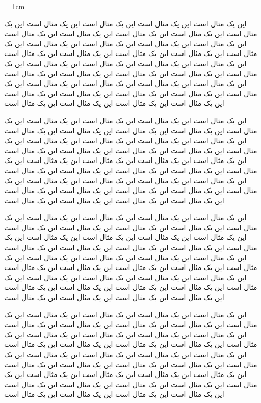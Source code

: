 \documentclass{report}
\begin{document}
\baselineskip = 1cm

این یک مثال است این یک مثال است این یک مثال است این یک مثال است این یک مثال است این یک مثال است این یک مثال است این یک مثال است این یک مثال است این یک مثال است
این یک مثال است این یک مثال است این یک مثال است این یک مثال است این یک مثال است این یک مثال است این یک مثال است این یک مثال است این یک مثال است این یک مثال است
این یک مثال است این یک مثال است این یک مثال است این یک مثال است این یک مثال است این یک مثال است این یک مثال است این یک مثال است این یک مثال است این یک مثال است
این یک مثال است این یک مثال است این یک مثال است این یک مثال است این یک مثال است این یک مثال است این یک مثال است این یک مثال است این یک مثال است این یک مثال است

این یک مثال است این یک مثال است این یک مثال است این یک مثال است این یک مثال است این یک مثال است این یک مثال است این یک مثال است این یک مثال است این یک مثال است
این یک مثال است این یک مثال است این یک مثال است این یک مثال است این یک مثال است این یک مثال است این یک مثال است این یک مثال است این یک مثال است این یک مثال است
این یک مثال است این یک مثال است این یک مثال است این یک مثال است این یک مثال است این یک مثال است این یک مثال است این یک مثال است این یک مثال است این یک مثال است
این یک مثال است این یک مثال است این یک مثال است این یک مثال است این یک مثال است این یک مثال است این یک مثال است این یک مثال است این یک مثال است این یک مثال است

این یک مثال است این یک مثال است این یک مثال است این یک مثال است این یک مثال است این یک مثال است این یک مثال است این یک مثال است این یک مثال است این یک مثال است
این یک مثال است این یک مثال است این یک مثال است این یک مثال است این یک مثال است این یک مثال است این یک مثال است این یک مثال است این یک مثال است این یک مثال است
این یک مثال است این یک مثال است این یک مثال است این یک مثال است این یک مثال است این یک مثال است این یک مثال است این یک مثال است این یک مثال است این یک مثال است
این یک مثال است این یک مثال است این یک مثال است این یک مثال است این یک مثال است این یک مثال است این یک مثال است این یک مثال است این یک مثال است این یک مثال است

این یک مثال است این یک مثال است این یک مثال است این یک مثال است این یک مثال است این یک مثال است این یک مثال است این یک مثال است این یک مثال است این یک مثال است
این یک مثال است این یک مثال است این یک مثال است این یک مثال است این یک مثال است این یک مثال است این یک مثال است این یک مثال است این یک مثال است این یک مثال است
این یک مثال است این یک مثال است این یک مثال است این یک مثال است این یک مثال است این یک مثال است این یک مثال است این یک مثال است این یک مثال است این یک مثال است
این یک مثال است این یک مثال است این یک مثال است این یک مثال است این یک مثال است این یک مثال است این یک مثال است این یک مثال است این یک مثال است این یک مثال است
\end{document}
